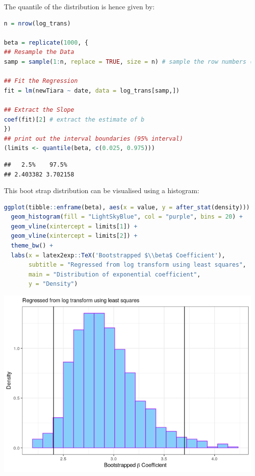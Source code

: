 \documentclass{article}
\begin{document}
The quantile of the distribution is hence given by:

\begin{lstlisting}[language=R]
n = nrow(log_trans)

beta = replicate(1000, {
## Resample the Data
samp = sample(1:n, replace = TRUE, size = n) # sample the row numbers (with replacement)

## Fit the Regression
fit = lm(newTiara ~ date, data = log_trans[samp,])

## Extract the Slope
coef(fit)[2] # extract the estimate of b
})
## print out the interval boundaries (95% interval)
(limits <- quantile(beta, c(0.025, 0.975)))
\end{lstlisting}

\begin{lstlisting}
##   2.5%    97.5%
## 2.403382 3.702158
\end{lstlisting}

This boot strap distribution can be visualised using a histogram:

\begin{lstlisting}[language=R]
ggplot(tibble::enframe(beta), aes(x = value, y = after_stat(density))) +
  geom_histogram(fill = "LightSkyBlue", col = "purple", bins = 20) +
  geom_vline(xintercept = limits[1]) +
  geom_vline(xintercept = limits[2]) +
  theme_bw() +
  labs(x = latex2exp::TeX('Bootstrapped $\\beta$ Coefficient'),
       subtitle = "Regressed from log transform using least squares", 
       main = "Distribution of exponential coefficient", 
       y = "Density")
\end{lstlisting}

\includegraphics{main_files/figure-html/unnamed-chunk-18-1.png}
\end{document}
